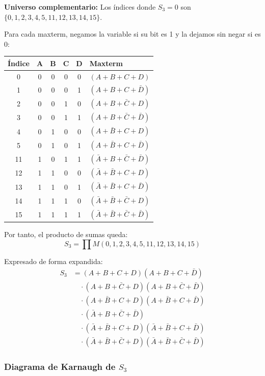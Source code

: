 \documentclass[11pt,a4paper]{article}
\begin{document}
\textbf{Universo complementario:} Los índices donde $S_3 = 0$ son $\{0,1,2,3,4,5,11,12,13,14,15\}$.

Para cada maxterm, negamos la variable si su bit es 1 y la dejamos sin negar si es 0:

\begin{center}
\begin{tabular}{|c|c|c|c|c|l|}
\hline
\textbf{Índice} & A & B & C & D & \textbf{Maxterm} \\
\hline
0  & 0 & 0 & 0 & 0 & $(A + B + C + D)$ \\
1  & 0 & 0 & 0 & 1 & $(A + B + C + \bar{D})$ \\
2  & 0 & 0 & 1 & 0 & $(A + B + \bar{C} + D)$ \\
3  & 0 & 0 & 1 & 1 & $(A + B + \bar{C} + \bar{D})$ \\
4  & 0 & 1 & 0 & 0 & $(A + \bar{B} + C + D)$ \\
5  & 0 & 1 & 0 & 1 & $(A + \bar{B} + C + \bar{D})$ \\
11 & 1 & 0 & 1 & 1 & $(\bar{A} + B + \bar{C} + \bar{D})$ \\
12 & 1 & 1 & 0 & 0 & $(\bar{A} + \bar{B} + C + D)$ \\
13 & 1 & 1 & 0 & 1 & $(\bar{A} + \bar{B} + C + \bar{D})$ \\
14 & 1 & 1 & 1 & 0 & $(\bar{A} + \bar{B} + \bar{C} + D)$ \\
15 & 1 & 1 & 1 & 1 & $(\bar{A} + \bar{B} + \bar{C} + \bar{D})$ \\
\hline
\end{tabular}
\end{center}

Por tanto, el producto de sumas queda:
\[S_3 = \prod M(0,1,2,3,4,5,11,12,13,14,15)\]

Expresado de forma expandida:
\begin{align*}
S_3 &= (A + B + C + D)(A + B + C + \bar{D}) \\
&\quad \cdot (A + B + \bar{C} + D)(A + B + \bar{C} + \bar{D}) \\
&\quad \cdot (A + \bar{B} + C + D)(A + \bar{B} + C + \bar{D}) \\
&\quad \cdot (\bar{A} + B + \bar{C} + \bar{D}) \\
&\quad \cdot (\bar{A} + \bar{B} + C + D)(\bar{A} + \bar{B} + C + \bar{D}) \\
&\quad \cdot (\bar{A} + \bar{B} + \bar{C} + D)(\bar{A} + \bar{B} + \bar{C} + \bar{D})
\end{align*}

\subsubsection*{Diagrama de Karnaugh de $S_3$}
\end{document}
